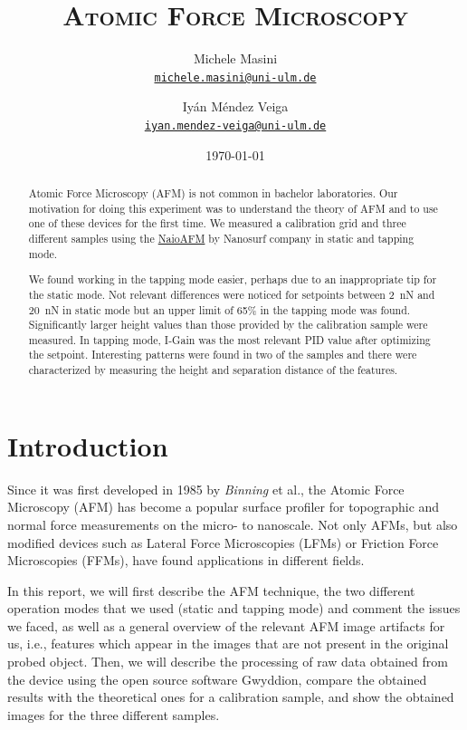 \documentclass[11pt,a4paper]{article}
\title{\bfseries\textsc{Atomic Force Microscopy}}
\author{
Michele Masini\\ \small\texttt{\href{mailto:michele.masini@uni-ulm.de}{michele.masini@uni-ulm.de}}\and
Iyán Méndez Veiga\\ \small\texttt{\href{mailto:iyan.mendez-veiga@uni-ulm.de}{iyan.mendez-veiga@uni-ulm.de}}
}
\date{\today}
\begin{document}
\maketitle

\begin{abstract}
Atomic Force Microscopy (AFM) is not common in bachelor laboratories. Our motivation for doing this experiment was to understand the theory of AFM and to use one of these devices for the first time. We measured a calibration grid and three different samples using the \href{https://www.nanosurf.com/en/products/naioafm-the-leading-compact-afm}{NaioAFM} by Nanosurf company in static and tapping mode.

We found working in the tapping mode easier, perhaps due to an inappropriate tip for the static mode. Not relevant differences were noticed for setpoints between \SI{2}{\nano\N} and \SI{20}{\nano\N} in static mode but an upper limit of 65\% in the tapping mode was found. Significantly larger height values than those provided by the calibration sample were measured.  In tapping mode, I-Gain was the most relevant PID value after optimizing the setpoint. Interesting patterns were found in two of the samples and there were characterized by measuring the height and separation distance of the features.
\end{abstract}

\section{Introduction}

Since it was first developed in 1985 by \emph{Binning} et al., the Atomic Force Microscopy (AFM) \cite{Bhushan} has become a popular surface profiler for topographic and normal force measurements on the micro- to nanoscale. Not only AFMs, but also modified devices such as Lateral Force Microscopies (LFMs) or Friction Force Microscopies (FFMs), have found applications in different fields.

In this report, we will first describe the AFM technique, the two different operation modes that we used (static and tapping mode) and comment the issues we faced, as well as a general overview of the relevant AFM image artifacts for us, i.e., features which appear in the images that are not present in the original probed object. Then, we will describe the processing of raw data obtained from the device using the open source software Gwyddion, compare the obtained results with the theoretical ones for a calibration sample, and show the obtained images for the three different samples.
\end{document}
